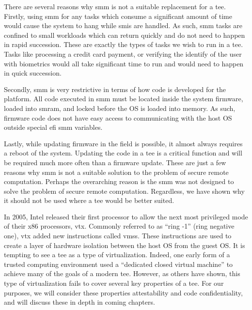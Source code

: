 There are several reasons why \gls{smm} is not a suitable replacement for a \gls{tee}. Firstly, using \gls{smm} for any tasks which consume a significant amount of time would cause the system to hang while \glspl{smi} are handled. As such, \gls{smm} tasks are confined to small workloads which can return quickly and do not need to happen in rapid succession. These are exactly the types of tasks we wish to run in a \gls{tee}. Tasks like processing a credit card payment, or verifying the identify of the user with biometrics would all take significant time to run and would need to happen in quick succession.

Secondly, \gls{smm} is very restrictive in terms of how code is developed for the platform. All code executed in \gls{smm} must be located inside the system firmware, loaded into \gls{smram}, and locked before the OS is loaded into memory. As such, firmware code does not have easy access to communicating with the host OS outside special \gls{efi} \gls{smm} variables. \cite{uefi2020}

Lastly, while updating firmware in the field is possible, \cite{zimmer2011apparatus} it almost always requires a reboot of the system. Updating the code in a \gls{tee} is a critical function and will be required much more often than a firmware update. These are just a few reasons why \gls{smm} is not a suitable solution to the problem of secure remote computation. Perhaps the overarching reason is the \gls{smm} was not designed to solve the problem of secure remote computation. Regardless, we have shown why it should not be used where a \gls{tee} would be better suited.

In 2005, \cite{uhlig2005intel} Intel released their first processor to allow the next most privileged mode of their x86 processors, \gls{vtx}. Commonly referred to as ``ring -1'' (ring negative one), \gls{vtx} added new instructions called \glspl{vms}. These instructions are used to create a layer of hardware isolation between the host OS from the guest OS. It is tempting to see a \gls{tee} as a type of virtualization. Indeed, one early form of a trusted computing environment used a ``dedicated closed virtual machine'' \cite{garfinkel2003terra} to achieve many of the goals of a modern \gls{tee}. However, as others have shown, \cite{teeWhatIsIt} this type of virtualization fails to cover several key properties of a \gls{tee}. For our purposes, we will consider these properties attestability and code confidentiality, and will discuss these in depth in coming chapters.

